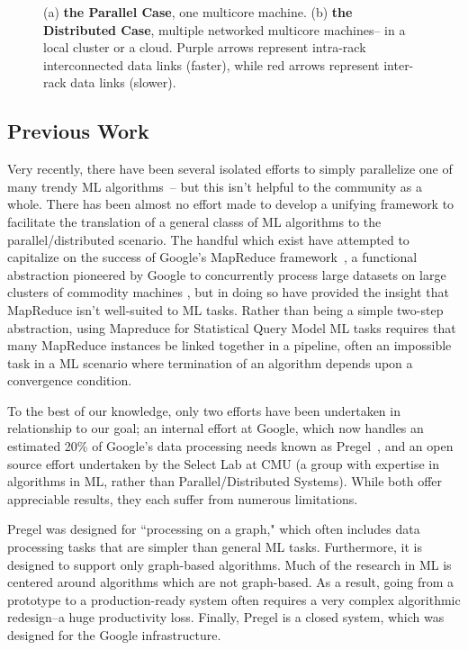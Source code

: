 \documentclass[acmtocl]{acmtrans2m}
\newlength{\gnuplotWidth}
\begin{document}
\begin{figure}
    \centering
     \hfil
    \hfil
    \caption{(a) {\bf the Parallel Case}, one multicore machine. (b) {\bf the Distributed Case}, multiple networked multicore machines-- in a local cluster or a cloud. Purple arrows represent intra-rack interconnected data links (faster), while red arrows represent inter-rack data links (slower).}
    \label{fig:parvsdist}
\end{figure}

\subsection{Previous Work}
Very recently, there have been several isolated efforts to simply parallelize one of many trendy ML algorithms~\cite{Bornschein2010,Nikolova2010,Louppe2010}-- but this isn't helpful to the community as a whole. There has been almost no effort made to develop a unifying framework to facilitate the translation of a general classs of ML algorithms to the parallel/distributed scenario. The handful which exist have attempted to capitalize on the success of Google's MapReduce framework~\cite{ChuKLYBNO06,PandaHBB09}, a functional abstraction pioneered by Google to concurrently process large datasets on large clusters of commodity machines \cite{Dean-Ghemawat08}, but in doing so have provided the insight that MapReduce isn't well-suited to ML tasks. Rather than being a simple two-step abstraction, using Mapreduce for Statistical Query Model ML tasks \cite{Kearns1998} requires that many MapReduce instances be linked together in a pipeline, often an impossible task in a ML scenario where termination of an algorithm depends upon a convergence condition.

To the best of our knowledge, only two efforts have been undertaken in relationship to our goal; an internal effort at Google, which now handles an estimated 20\% of Google's data processing needs known as Pregel~\cite{MalewiczABDHLC09}, and an open source effort undertaken by the Select Lab at CMU (a group with expertise in algorithms in ML, rather than Parallel/Distributed Systems). While both offer appreciable results, they each suffer from numerous limitations.

Pregel was designed for ``processing on a graph," which often includes data processing tasks that are simpler than general ML tasks. Furthermore, it is designed to support only graph-based algorithms. Much of the research in ML is centered around algorithms which are not graph-based. As a result, going from a prototype to a production-ready system often requires a very complex algorithmic redesign--a huge productivity loss. Finally, Pregel is a closed system, which was designed for the Google infrastructure.
\end{document}
